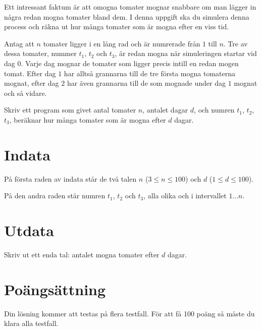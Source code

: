 Ett intressant faktum är att omogna tomater mognar snabbare om man lägger in några redan mogna tomater bland dem.
I denna uppgift ska du simulera denna process och räkna ut hur många tomater som är mogna efter en viss tid.

Antag att $n$ tomater ligger i en lång rad och är numrerade från $1$ till $n$.
Tre av dessa tomater, nummer $t_1$, $t_2$ och $t_3$, är redan mogna när simuleringen startar vid dag $0$.
Varje dag mognar de tomater som ligger precis intill en redan mogen tomat.
Efter dag $1$ har alltså grannarna till de tre första mogna tomaterna mognat, efter dag $2$ har även grannarna till de som mognade under dag $1$ mognat och så vidare.

Skriv ett program som givet antal tomater $n$, antalet dagar $d$, och numren $t_1$, $t_2$, $t_3$, beräknar hur många tomater som är mogna efter $d$ dagar.

\section*{Indata}
På första raden av indata står de två talen $n$ ($3 \le n \le 100$) och $d$ ($1 \le d \le 100$).

På den andra raden står numren $t_1$, $t_2$ och $t_3$, alla olika och i intervallet $1 \dots n$.

\section*{Utdata}
Skriv ut ett enda tal: antalet mogna tomater efter $d$ dagar.

\section*{Poängsättning}
Din lösning kommer att testas på flera testfall. För att få 100 poäng så måste du klara alla testfall.

